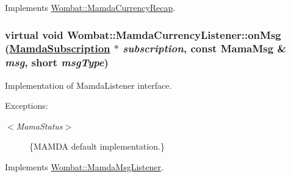 Implements \hyperlink{classWombat_1_1MamdaCurrencyRecap_9c164af05a5d96f69f20dfdfd46d2211}{Wombat::Mamda\-Currency\-Recap}.\hypertarget{classWombat_1_1MamdaCurrencyListener_0cc612d96663c187bab76d284912dbfe}{
\subsubsection[onMsg]{\setlength{\rightskip}{0pt plus 5cm}virtual void Wombat::Mamda\-Currency\-Listener::on\-Msg (\hyperlink{classWombat_1_1MamdaSubscription}{Mamda\-Subscription} $\ast$ {\em subscription}, const Mama\-Msg \& {\em msg}, short {\em msg\-Type})}}
\label{classWombat_1_1MamdaCurrencyListener_0cc612d96663c187bab76d284912dbfe}


Implementation of Mamda\-Listener interface. 

\par
 \begin{Desc}
\item[Exceptions:]
\begin{description}
\item[{\em $<$Mama\-Status$>$}]\{MAMDA default implementation.\} \end{description}
\end{Desc}


Implements \hyperlink{classWombat_1_1MamdaMsgListener_c700829ebcce095b95b8b67b39a1c67d}{Wombat::Mamda\-Msg\-Listener}.